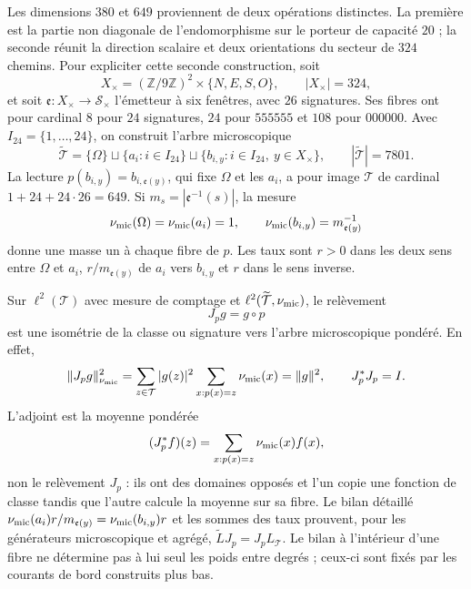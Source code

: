 Les dimensions $380$ et $649$ proviennent de deux opérations distinctes. La
première est la partie non diagonale de l’endomorphisme sur le porteur de
capacité $20$ ; la seconde réunit la direction scalaire et deux orientations
du secteur de $324$ chemins. Pour expliciter cette seconde construction,
soit
\[
 X_\times=(\mathbb Z/9\mathbb Z)^2\times\{N,E,S,O\},
 \qquad |X_\times|=324,
\]
et soit $\mathfrak e:X_\times\to\mathcal S_\times$ l’émetteur à six
fenêtres, avec $26$ signatures. Ses fibres ont pour cardinal $8$ pour $24$ signatures,
$24$ pour $555555$ et $108$ pour $000000$. Avec
$I_{24}=\{1,\ldots,24\}$, on construit l’arbre microscopique
\begin{equation}
 \widetilde{\mathcal T}=\{\Omega\}\sqcup\{a_i:i\in I_{24}\}
 \sqcup\{b_{i,y}:i\in I_{24},\ y\in X_\times\},
 \qquad |\widetilde{\mathcal T}|=7801.
 \label{v:eq:arbol-microscopico-7801}
\end{equation}
La lecture $p(b_{i,y})=b_{i,\mathfrak e(y)}$, qui fixe $\Omega$ et les
$a_i$, a pour image $\mathcal T$ de cardinal
$1+24+24\cdot26=649$. Si
$m_s=|\mathfrak e^{-1}(s)|$, la mesure
\begin{equation}
 \nu_{\rm mic}(\Omega)=\nu_{\rm mic}(a_i)=1,
 \qquad \nu_{\rm mic}(b_{i,y})=m_{\mathfrak e(y)}^{-1}
 \label{v:eq:medida-arbol-microscopico}
\end{equation}
donne une masse un à chaque fibre de $p$. Les taux sont $r>0$ dans les deux sens
entre $\Omega$ et $a_i$, $r/m_{\mathfrak e(y)}$ de $a_i$ vers $b_{i,y}$
et $r$ dans le sens inverse.

Sur $\ell^2(\mathcal T)$ avec mesure de comptage et
$\ell^2(\widetilde{\mathcal T},\nu_{\rm mic})$, le relèvement
\begin{equation}
 J_p g=g\circ p
 \label{v:eq:levantamiento-fibras-Jp}
\end{equation}
est une isométrie de la classe ou signature vers l’arbre microscopique pondéré.
En effet,
\[
 \|J_pg\|_{\nu_{\rm mic}}^2
 =\sum_{z\in\mathcal T}|g(z)|^2
   \sum_{x:p(x)=z}\nu_{\rm mic}(x)=\|g\|^2,
 \qquad J_p^*J_p=I.
\]
L’adjoint est la moyenne pondérée
\begin{equation}
 (J_p^*f)(z)=\sum_{x:p(x)=z}\nu_{\rm mic}(x)f(x),
 \label{v:eq:adjunto-fibras-Jp}
\end{equation}
non le relèvement $J_p$ : ils ont des domaines opposés et l’un copie une fonction
de classe tandis que l’autre calcule la moyenne sur sa fibre. Le bilan détaillé
$\nu_{\rm mic}(a_i)r/m_{\mathfrak e(y)}
=\nu_{\rm mic}(b_{i,y})r$ et les sommes des taux prouvent, pour les
générateurs microscopique et agrégé,
$\widetilde L J_p=J_pL_{\mathcal T}$. Le bilan à l’intérieur d’une fibre ne
détermine pas à lui seul les poids entre degrés ; ceux-ci sont fixés par les
courants de bord construits plus bas.

